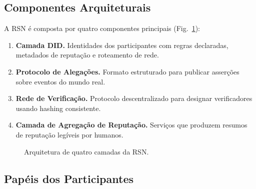 \documentclass[11pt,a4paper,twocolumn]{article}
\begin{document}
\subsection{Componentes Arquiteturais}

A RSN é composta por quatro componentes principais (Fig.~\ref{fig:architecture}):
\begin{enumerate}[nosep]
\item \textbf{Camada DID.} Identidades dos participantes com regras declaradas, metadados de reputação e roteamento de rede.
\item \textbf{Protocolo de Alegações.} Formato estruturado para publicar asserções sobre eventos do mundo real.
\item \textbf{Rede de Verificação.} Protocolo descentralizado para designar verificadores usando hashing consistente.
\item \textbf{Camada de Agregação de Reputação.} Serviços que produzem resumos de reputação legíveis por humanos.
\end{enumerate}

\begin{figure}[ht]
\centering
{}
\caption{Arquitetura de quatro camadas da RSN.}
\label{fig:architecture}
\end{figure}

\subsection{Papéis dos Participantes}
\end{document}
